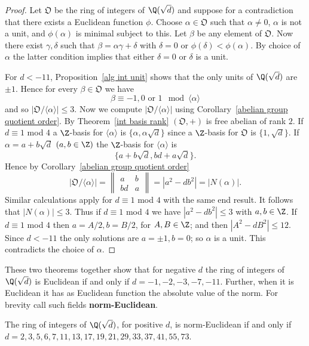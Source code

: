 \begin{proof}
Let $\mathfrak{O}$ be the ring of integers of $\Q(\sqrt{d})$ and suppose for a contradiction that there exists a Euclidean function $\phi$. Choose $\alpha\in\mathfrak{O}$ such that $\alpha\neq0$, $\alpha$ is not a unit, and $\phi(\alpha)$ is minimal subject to this. Let $\beta$ be any element of $\mathfrak{O}$. Now there exist $\gamma,\delta$ such that $\beta=\alpha\gamma+\delta$ with $\delta=0$ or $\phi(\delta)<\phi(\alpha)$. By choice of $\alpha$ the latter condition implies that either $\delta=0$ or $\delta$ is a unit.\par
For $d<-11$, Proposition~\ref{alg int unit} shows that the only units of $\Q(\sqrt{d})$ are $\pm1$. Hence for every $\beta\in\mathfrak{O}$ we have
\[\beta\equiv-1,0\text{ or }1\mod\langle\alpha\rangle\] 
and so $|\mathfrak{O}/\langle\alpha\rangle|\leq3$. Now we compute $|\mathfrak{O}/\langle\alpha\rangle|$ using Corollary~\ref{abelian group quotient order}. By Theorem~\ref{int basis rank} $(\mathfrak{O},+)$ is free abelian of rank $2$. If $d\equiv1$ mod $4$ a $\Z$-basis for $\langle\alpha\rangle$ is $\{\alpha,\alpha\sqrt{d}\}$ since a $\Z$-basis for $\mathfrak{O}$ is $\{1,\sqrt{d}\}$. If $\alpha=a+b\sqrt{d}$ $(a,b\in\Z)$ the $\Z$-basis for $\langle\alpha\rangle$ is
\[\{a+b\sqrt{d},bd+a\sqrt{d}\}.\]
Hence by Corollary~\ref{abelian group quotient order}
\[|\mathfrak{O}/\langle\alpha\rangle|=\left\|\begin{array}{cc}
a&b\\
bd&a
\end{array}\right\|=|a^2-db^2|=|N(\alpha)|.\]
Similar calculations apply for $d\equiv1$ mod $4$ with the same end result. It follows that $|N(\alpha)|\leq3$. Thus if $d\equiv1$ mod $4$ we have $|a^2-db^2|\leq3$ with $a,b\in\Z$. If $d\equiv1$ mod $4$ then $a=A/2,b=B/2$, for $A,B\in\Z$; and then $|A^2-dB^2|\leq12$. Since $d<-11$ the only solutions are $a=\pm1,b=0$; so $\alpha$ is a unit. This contradicts the choice of $\alpha$.
\end{proof}
These two theorems together show that for negative $d$ the ring of integers of $\Q(\sqrt{d})$ is Euclidean if and only if $d=-1,-2,-3,-7,-11$. Further, when it is Euclidean it has as Euclidean function the absolute value of the norm. For brevity call such fields \textbf{norm-Euclidean}.
\begin{theorem}
The ring of integers of $\Q(\sqrt{d})$, for positive $d$, is norm-Euclidean if and only if $d=2,3,5,6,7,11,13,17,19,21,29,33,37,41,55,73$.
\end{theorem}
